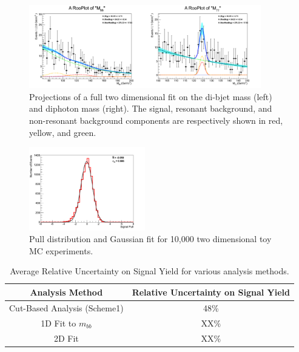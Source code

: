 \documentclass{cmspaper}
\begin{document}
\begin{figure}[h]
  \centering
  \includegraphics[width=0.9\textwidth]{figures/projectionFits_0.pdf}
  \caption{Projections of a full two dimensional fit on the di-bjet mass (left) and diphoton mass (right). The signal, resonant background, and non-resonant background components are respectively shown in red, yellow, and green.}
  \label{fig:twoDfullFit}
\end{figure}


\begin{figure}[h]
  \centering
  \includegraphics[width=0.45\textwidth]{figures/sigPullFitTwoD.pdf}
  \caption{Pull distribution and Gaussian fit for 10,000 two dimensional toy MC experiments.}
  \label{fig:twoDpullPlot}
\end{figure}



\begin{table}[!ht]
\begin{center} 
\begin{tabular}{|c|c|}
\hline 
Analysis Method                 &  Relative Uncertainty on Signal Yield \\  \hline
Cut-Based Analysis (Scheme1)    &  48\%                                 \\  
1D Fit to $m_{bb}$              &  XX\%                                 \\  
2D Fit                          &  XX\%                                 \\  \hline
\end{tabular}
\caption{Average Relative Uncertainty on Signal Yield for various analysis methods. }
\label{tab:RelativeUncertaintyOnSignalYield}
\end{center}
\end{table}
 
\end{document}
